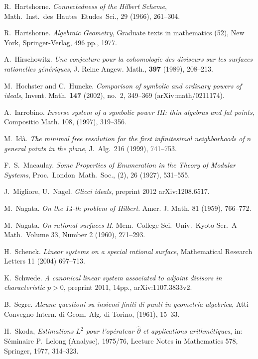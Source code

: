 \documentclass[11pt,twoside]{amsart}
\numberwithin{equation}{section}
\theoremstyle{definition}
\begin{document}
\begin{thebibliography}{B. et al}
 R.\ Hartshorne.
\emph{Connectedness of the Hilbert Scheme},
Math.\ Inst.\ des\ Hautes\ Etudes\ Sci., 29 (1966), 261--304.

 R.\ Hartshorne. 
\emph{Algebraic Geometry}, 
Graduate texts in mathematics (52), New York,
Springer-Verlag, 496 pp., 1977.

 A.\ Hirschowitz. 
\emph{Une conjecture pour la cohomologie des diviseurs sur les
surfaces rationelles g\'en\'eriques}, J. Reine Angew. Math., {\bf 397} (1989), 208--213.

M.\ Hochster and C.\ Huneke. \emph{Comparison of symbolic and 
ordinary powers of ideals}, Invent. Math. {\bf 147} 
(2002), no.~2, 349--369 (arXiv:math/0211174).

 A.\ Iarrobino. \emph{Inverse system of a symbolic power III: thin algebras and fat points}, 
Compositio Math. 108, (1997), 319--356.

 M.\ Id\`a. 
\emph{The minimal free resolution for the first infinitesimal neighborhoods of $n$ general points in the plane}, 
J.\ Alg.\ 216 (1999), 741--753. 

 F.\ S.\ Macaulay.
\emph{Some Properties of Enumeration in the Theory of Modular Systems},
Proc.\ London\ Math.\ Soc., (2), 26 (1927), 531--555.

 J.\ Migliore, U.\ Nagel. \emph{Glicci ideals}, preprint 2012 
arXiv:1208.6517.

 M.\ Nagata. \emph{On the 14-th problem of Hilbert}. Amer. J. Math. 81 (1959), 766--772. 

 M.\ Nagata. \emph{On rational surfaces II}.  Mem.\ College Sci.\ Univ.\ Kyoto Ser.\ A Math.\ 
Volume 33, Number 2 (1960), 271--293.

 H.\ Schenck.
\emph{Linear systems on a special rational surface}, 
Mathematical Research Letters 11 (2004) 697--713. 

 K.\ Schwede.
\emph{A canonical linear system associated to adjoint divisors in characteristic $p>0$},
preprint 2011, 14pp., arXiv:1107.3833v2.

 B.\ Segre. 
\emph{Alcune questioni su insiemi finiti di punti in geometria algebrica}, 
Atti Convegno Intern. di Geom. Alg. di Torino, (1961), 15--33.

 H.\ Skoda, \emph{Estimations $L^2$ pour l'op\'erateur 
$\hat{\partial}$ et applications arithm\'etiques}, in: S\'eminaire P.\ Lelong (Analyse), 1975/76, 
Lecture Notes in Mathematics 578, Springer, 1977, 314--323.


\end{thebibliography}
\end{document}
